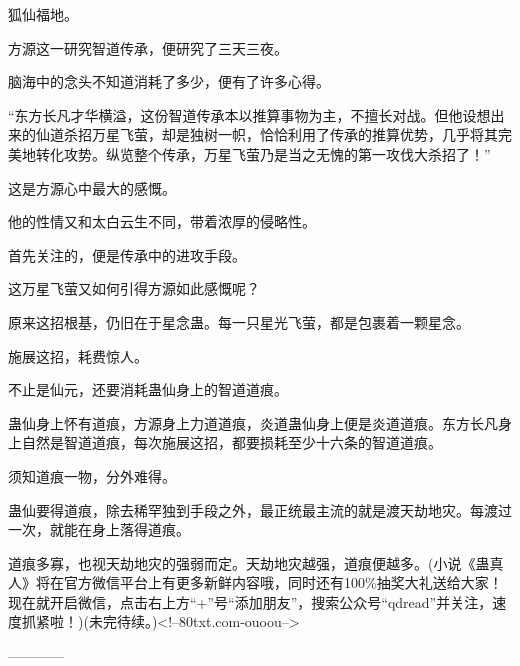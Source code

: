 \begin{this_body}
狐仙福地。

方源这一研究智道传承，便研究了三天三夜。

脑海中的念头不知道消耗了多少，便有了许多心得。

“东方长凡才华横溢，这份智道传承本以推算事物为主，不擅长对战。但他设想出来的仙道杀招万星飞萤，却是独树一帜，恰恰利用了传承的推算优势，几乎将其完美地转化攻势。纵览整个传承，万星飞萤乃是当之无愧的第一攻伐大杀招了！”

这是方源心中最大的感慨。

他的性情又和太白云生不同，带着浓厚的侵略性。

首先关注的，便是传承中的进攻手段。

这万星飞萤又如何引得方源如此感慨呢？

原来这招根基，仍旧在于星念蛊。每一只星光飞萤，都是包裹着一颗星念。

施展这招，耗费惊人。

不止是仙元，还要消耗蛊仙身上的智道道痕。

蛊仙身上怀有道痕，方源身上力道道痕，炎道蛊仙身上便是炎道道痕。东方长凡身上自然是智道道痕，每次施展这招，都要损耗至少十六条的智道道痕。

须知道痕一物，分外难得。

蛊仙要得道痕，除去稀罕独到手段之外，最正统最主流的就是渡天劫地灾。每渡过一次，就能在身上落得道痕。

道痕多寡，也视天劫地灾的强弱而定。天劫地灾越强，道痕便越多。(小说《蛊真人》将在官方微信平台上有更多新鲜内容哦，同时还有100\%抽奖大礼送给大家！现在就开启微信，点击右上方“+”号“添加朋友”，搜索公众号“qdread”并关注，速度抓紧啦！)(未完待续。)<!--80txt.com-ouoou-->

------------

\end{this_body}


